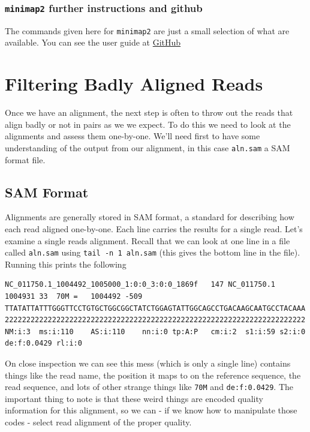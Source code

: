 \documentclass[]{book}
\begin{document}
\hypertarget{minimap2-further-instructions-and-github}{%
\subsection{\texorpdfstring{\texttt{minimap2} further instructions and github}{minimap2 further instructions and github}}\label{minimap2-further-instructions-and-github}}

The commands given here for \texttt{minimap2} are just a small selection of what are available. You can see the user guide at \href{https://github.com/lh3/minimap2}{GitHub}

\hypertarget{filtering-badly-aligned-reads}{%
\chapter{Filtering Badly Aligned Reads}\label{filtering-badly-aligned-reads}}

Once we have an alignment, the next step is often to throw out the reads that align badly or not in pairs as we we expect. To do this we need to look at the alignments and assess them one-by-one. We'll need first to have some understanding of the output from our alignment, in this case \texttt{aln.sam} a SAM format file.

\hypertarget{sam-format}{%
\section{SAM Format}\label{sam-format}}

Alignments are generally stored in SAM format, a standard for describing how each read aligned one-by-one. Each line carries the results for a single read. Let's examine a single reads alignment. Recall that we can look at one line in a file called \texttt{aln.sam} using \texttt{tail\ -n\ 1\ aln.sam} (this gives the bottom line in the file). Running this prints the following

\begin{verbatim}
NC_011750.1_1004492_1005000_1:0:0_3:0:0_1869f   147 NC_011750.1 1004931 33  70M =   1004492 -509 TTATATTATTTGGGTTCCTGTGCTGGCGGCTATCTGGAGTATTGGCAGCCTGACAAGCAATGCCTACAAA 2222222222222222222222222222222222222222222222222222222222222222222222  NM:i:3  ms:i:110    AS:i:110    nn:i:0 tp:A:P   cm:i:2  s1:i:59 s2:i:0  de:f:0.0429 rl:i:0
\end{verbatim}

On close inspection we can see this mess (which is only a single line) contains things like the read name, the position it maps to on the reference sequence, the read sequence, and lots of other strange things like \texttt{70M} and \texttt{de:f:0.0429}. The important thing to note is that these weird things are encoded quality information for this alignment, so we can - if we know how to manipulate those codes - select read alignment of the proper quality.
\end{document}
